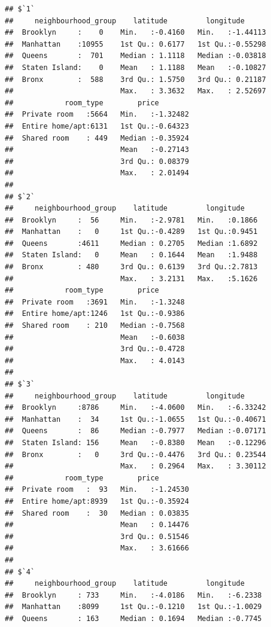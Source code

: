 \documentclass[
]{article}
\begin{document}
\begin{verbatim}
## $`1`
##     neighbourhood_group    latitude         longitude       
##  Brooklyn     :    0    Min.   :-0.4160   Min.   :-1.44113  
##  Manhattan    :10955    1st Qu.: 0.6177   1st Qu.:-0.55298  
##  Queens       :  701    Median : 1.1118   Median :-0.03818  
##  Staten Island:    0    Mean   : 1.1188   Mean   :-0.10827  
##  Bronx        :  588    3rd Qu.: 1.5750   3rd Qu.: 0.21187  
##                         Max.   : 3.3632   Max.   : 2.52697  
##            room_type        price         
##  Private room   :5664   Min.   :-1.32482  
##  Entire home/apt:6131   1st Qu.:-0.64323  
##  Shared room    : 449   Median :-0.35924  
##                         Mean   :-0.27143  
##                         3rd Qu.: 0.08379  
##                         Max.   : 2.01494  
## 
## $`2`
##     neighbourhood_group    latitude         longitude     
##  Brooklyn     :  56     Min.   :-2.9781   Min.   :0.1866  
##  Manhattan    :   0     1st Qu.:-0.4289   1st Qu.:0.9451  
##  Queens       :4611     Median : 0.2705   Median :1.6892  
##  Staten Island:   0     Mean   : 0.1644   Mean   :1.9488  
##  Bronx        : 480     3rd Qu.: 0.6139   3rd Qu.:2.7813  
##                         Max.   : 3.2131   Max.   :5.1626  
##            room_type        price        
##  Private room   :3691   Min.   :-1.3248  
##  Entire home/apt:1246   1st Qu.:-0.9386  
##  Shared room    : 210   Median :-0.7568  
##                         Mean   :-0.6038  
##                         3rd Qu.:-0.4728  
##                         Max.   : 4.0143  
## 
## $`3`
##     neighbourhood_group    latitude         longitude       
##  Brooklyn     :8786     Min.   :-4.0600   Min.   :-6.33242  
##  Manhattan    :  34     1st Qu.:-1.0655   1st Qu.:-0.40671  
##  Queens       :  86     Median :-0.7977   Median :-0.07171  
##  Staten Island: 156     Mean   :-0.8380   Mean   :-0.12296  
##  Bronx        :   0     3rd Qu.:-0.4476   3rd Qu.: 0.23544  
##                         Max.   : 0.2964   Max.   : 3.30112  
##            room_type        price         
##  Private room   :  93   Min.   :-1.24530  
##  Entire home/apt:8939   1st Qu.:-0.35924  
##  Shared room    :  30   Median : 0.03835  
##                         Mean   : 0.14476  
##                         3rd Qu.: 0.51546  
##                         Max.   : 3.61666  
## 
## $`4`
##     neighbourhood_group    latitude         longitude      
##  Brooklyn     : 733     Min.   :-4.0186   Min.   :-6.2338  
##  Manhattan    :8099     1st Qu.:-0.1210   1st Qu.:-1.0029  
##  Queens       : 163     Median : 0.1694   Median :-0.7745  

\end{verbatim}
\end{document}
